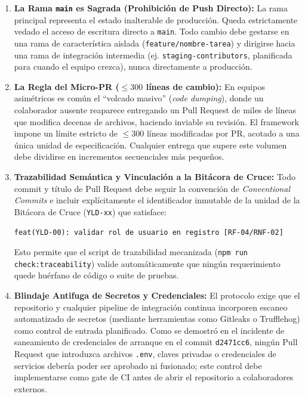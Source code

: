 \documentclass[14pt,a4paper,oneside]{extbook}
\begin{document}
\begin{enumerate}
    \item \textbf{La Rama \texttt{main} es Sagrada (Prohibición de Push Directo):} La rama principal representa el estado inalterable de producción. Queda estrictamente vedado el acceso de escritura directo a \texttt{main}. Todo cambio debe gestarse en una rama de característica aislada (\texttt{feature/nombre-tarea}) y dirigirse hacia una rama de integración intermedia (ej. \texttt{staging-contributors}, planificada para cuando el equipo crezca), nunca directamente a producción.
    
    \item \textbf{La Regla del Micro-PR ($\le 300$ líneas de cambio):} En equipos asimétricos es común el \enquote{volcado masivo} (\textit{code dumping}), donde un colaborador ausente reaparece entregando un Pull Request de miles de líneas que modifica decenas de archivos, haciendo inviable su revisión. El framework impone un límite estricto de $\le 300$ líneas modificadas por PR, acotado a una única unidad de especificación. Cualquier entrega que supere este volumen debe dividirse en incrementos secuenciales más pequeños.
    
    \item \textbf{Trazabilidad Semántica y Vinculación a la Bitácora de Cruce:} Todo commit y título de Pull Request debe seguir la convención de \textit{Conventional Commits} e incluir explícitamente el identificador inmutable de la unidad de la Bitácora de Cruce (\texttt{YLD-xx}) que satisface:
    \begin{center}
    \texttt{feat(YLD-00): validar rol de usuario en registro [RF-04/RNF-02]}
    \end{center}
    Esto permite que el script de trazabilidad mecanizada (\texttt{npm run check:traceability}) valide automáticamente que ningún requerimiento quede huérfano de código o suite de pruebas.

    \item \textbf{Blindaje Antifuga de Secretos y Credenciales:} El protocolo exige que el repositorio y cualquier pipeline de integración continua incorporen escaneo automatizado de secretos (mediante herramientas como Gitleaks o Trufflehog) como control de entrada planificado. Como se demostró en el incidente de saneamiento de credenciales de arranque en el commit \texttt{d2471cc6}, ningún Pull Request que introduzca archivos \texttt{.env}, claves privadas o credenciales de servicios debería poder ser aprobado ni fusionado; este control debe implementarse como gate de CI antes de abrir el repositorio a colaboradores externos.


\end{enumerate}
\end{document}
